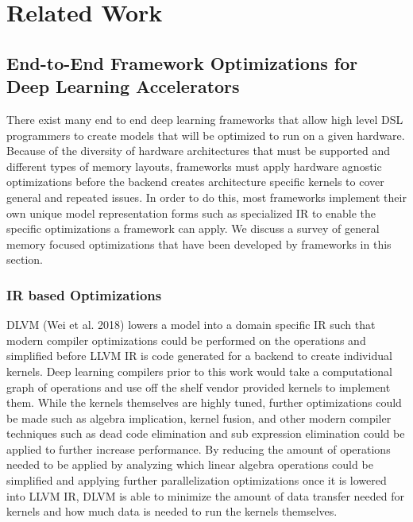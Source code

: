 
\chapter{Related Work} %

\label{Chapter3} %

\section{End-to-End Framework Optimizations for Deep Learning Accelerators}
There exist many end to end deep learning frameworks that allow
high level DSL programmers to create models that will be optimized to run
on a given hardware. Because of the diversity of hardware architectures that
must be supported and different types of memory layouts, frameworks must 
apply hardware agnostic optimizations before the backend creates architecture
specific kernels to cover general and repeated issues. In order to do this,
most frameworks implement their own unique model representation forms such
as specialized IR to enable the specific optimizations a framework can apply.
We discuss a survey of general memory focused optimizations that have been
developed by frameworks in this section.

\subsection{IR based Optimizations}
DLVM \cite{DLVM} (Wei et al. 2018) lowers a model into a domain specific IR
such that modern compiler optimizations could be performed on the operations
and simplified before LLVM IR is code generated for a backend to create
individual kernels. Deep learning compilers \cite{tensorflow} \cite{torch}
prior to this work would take a computational graph of operations and use off
the shelf vendor provided kernels to implement them. While the kernels
themselves are highly tuned, further optimizations could be made such as
algebra implication, kernel fusion, and other modern compiler techniques such
as dead code elimination and sub expression elimination could be applied to
further increase performance. By reducing the amount of operations needed to be
applied by analyzing which linear algebra operations could be simplified and
applying further parallelization optimizations once it is lowered into LLVM IR,
DLVM is able to minimize the amount of data transfer needed for kernels and how
much data is needed to run the kernels themselves.

